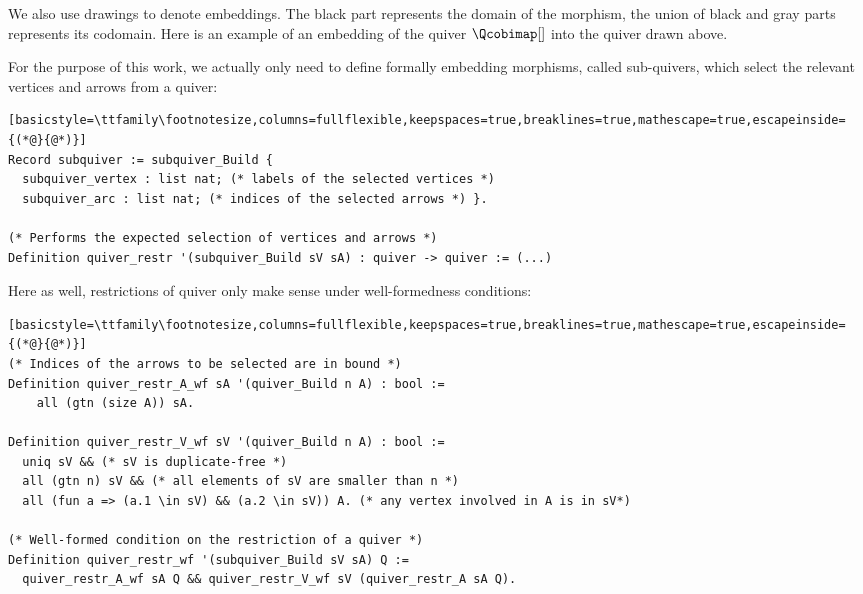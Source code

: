 We also use drawings to denote embeddings. The black part represents the domain of the morphism, the union of black and gray parts represents its codomain. Here is an example of an embedding of the quiver $\Qcobimap[]$ into the quiver drawn above.
\begin{center}
\end{center}

For the purpose of this work, we actually only need to define formally embedding morphisms, called sub-quivers, which select the relevant vertices and arrows from a quiver:
\begin{lstlisting}[basicstyle=\ttfamily\footnotesize,columns=fullflexible,keepspaces=true,breaklines=true,mathescape=true,escapeinside={(*@}{@*)}]
Record subquiver := subquiver_Build {
  subquiver_vertex : list nat; (* labels of the selected vertices *)
  subquiver_arc : list nat; (* indices of the selected arrows *) }.

(* Performs the expected selection of vertices and arrows *)
Definition quiver_restr '(subquiver_Build sV sA) : quiver -> quiver := (...)
\end{lstlisting}

Here as well, restrictions of quiver only make sense under well-formedness conditions:
\begin{lstlisting}[basicstyle=\ttfamily\footnotesize,columns=fullflexible,keepspaces=true,breaklines=true,mathescape=true,escapeinside={(*@}{@*)}]
(* Indices of the arrows to be selected are in bound *)
Definition quiver_restr_A_wf sA '(quiver_Build n A) : bool :=
    all (gtn (size A)) sA.

Definition quiver_restr_V_wf sV '(quiver_Build n A) : bool :=
  uniq sV && (* sV is duplicate-free *)
  all (gtn n) sV && (* all elements of sV are smaller than n *)
  all (fun a => (a.1 \in sV) && (a.2 \in sV)) A. (* any vertex involved in A is in sV*)

(* Well-formed condition on the restriction of a quiver *)
Definition quiver_restr_wf '(subquiver_Build sV sA) Q :=
  quiver_restr_A_wf sA Q && quiver_restr_V_wf sV (quiver_restr_A sA Q).
\end{lstlisting}

